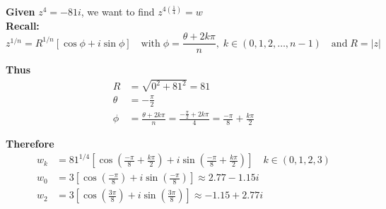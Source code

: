 \documentclass[a4paper, 8pt]{extarticle}
\begin{document}
\begin{examplebox}
    \label{sol:20188Q1b}
    \textbf{Given} $z^4 = -81i$, we want to find $z^{4\left(\frac{1}{4}\right)} = w $ \\
    \textbf{Recall:}
    $$z^{1/n} = R^{1/n}[\cos\phi + i\sin \phi] \quad \text{with} \; \phi = \frac{\theta + 2k\pi}{n}, \; k \in (0,1,2,\dots, n-1) \quad \text{and} \; R = |z|$$
    \begin{minipage}{0.49\textwidth}
        \textbf{Thus}
        \begin{align*}
            R      & = \sqrt{0^2 + 81^2} = 81                                                                        \\
            \theta & = -\frac{\pi}{2}                                                                                \\
            \phi   & = \frac{\theta + 2k\pi}{n} = \frac{-\frac{\pi}{2} + 2k\pi}{4} = \frac{-\pi}{8} + \frac{k\pi}{2}
        \end{align*}
    \end{minipage}
    \begin{minipage}{0.5\textwidth}
        \begin{center}
        \end{center}
    \end{minipage}

    \textbf{Therefore}
    \begin{align*}
        w_k & = 81^{1/4}\left[\cos\left(\frac{-\pi}{8} + \frac{k\pi}{2}\right) + i\sin\left(\frac{-\pi}{8} + \frac{k\pi}{2}\right)\right] \quad k \in (0,1,2,3) \\
        w_0 & = 3\left[\cos\left(\frac{-\pi}{8}\right) + i\sin\left(\frac{-\pi}{8}\right)\right] \approx 2.77 - 1.15i                                           \\
        w_2 & = 3\left[\cos\left(\frac{3\pi}{8}\right) + i\sin\left(\frac{3\pi}{8}\right)\right] \approx -1.15 + 2.77i                                          \\
    \end{align*}


\end{examplebox}
\end{document}
